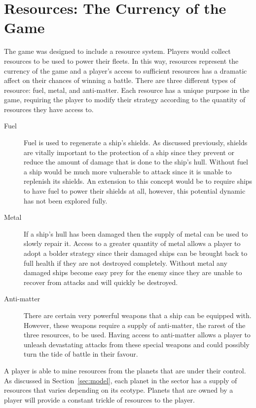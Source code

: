\section{Resources: The Currency of the Game}
\label{sec:resources}

The game was designed to include a resource system. Players would collect resources to be used to power their fleets. In this way, resources represent the currency of the game and a player's access to sufficient resources has a dramatic affect on their chances of winning a battle. There are three different types of resource: fuel, metal, and anti-matter. Each resource has a unique purpose in the game, requiring the player to modify their strategy according to the quantity of resources they have access to.

\begin{description}
\item[Fuel] Fuel is used to regenerate a ship's shields. As discussed previously, shields are vitally important to the protection of a ship since they prevent or reduce the amount of damage that is done to the ship's hull. Without fuel a ship would be much more vulnerable to attack since it is unable to replenish its shields. An extension to this concept would be to require ships to have fuel to power their shields at all, however, this potential dynamic has not been explored fully.

\item[Metal] If a ship's hull has been damaged then the supply of metal can be used to slowly repair it. Access to a greater quantity of metal allows a player to adopt a bolder strategy since their damaged ships can be brought back to full health if they are not destroyed completely. Without metal any damaged ships become easy prey for the enemy since they are unable to recover from attacks and will quickly be destroyed.

\item[Anti-matter] There are certain very powerful weapons that a ship can be equipped with. However, these weapons require a supply of anti-matter, the rarest of the three resources, to be used. Having access to anti-matter allows a player to unleash devastating attacks from these special weapons and could possibly turn the tide of battle in their favour.
\end{description}
\noindent
A player is able to mine resources from the planets that are under their control. As discussed in Section~\ref{sec:model}, each planet in the sector has a supply of resources that varies depending on its ecotype. Planets that are owned by a player will provide a constant trickle of resources to the player.

